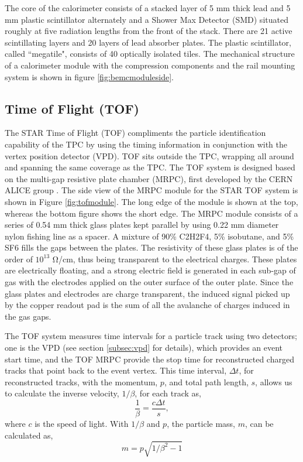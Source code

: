 
The core of the calorimeter consists of a stacked layer of 5 mm thick lead and 5 mm plastic scintillator alternately and a Shower Max Detector (SMD) situated roughly at five radiation lengths from the front of the stack. There are 21 active scintillating layers and 20 layers of lead absorber plates. The plastic scintillator, called ``megatile", consists of 40 optically isolated tiles. The mechanical structure of a calorimeter module with the compression components and the rail mounting system is shown in figure \ref{fig:bemcmoduleside}.
 
\subsection{Time of Flight (TOF)}
\label{subsec:tof}
The STAR Time of Flight (TOF) compliments the particle identification capability of the TPC by using the timing information in conjunction with the vertex position detector (VPD). TOF sits outside the TPC, wrapping all around and spanning the same coverage as the TPC. The TOF system is designed based on the multi-gap resistive plate chamber (MRPC), first developed by the CERN ALICE group \cite{Williams:2001mt}. The side view of the MRPC module for the STAR TOF system is shown in Figure \ref{fig:tofmodule}. The long edge of the module is shown at the top, whereas the bottom figure shows the short edge. The MRPC module consists of a series of  0.54 mm thick glass plates kept parallel by using 0.22 mm diameter nylon fishing line as a spacer. A mixture of 90\% C2H2F4, 5\% isobutane, and 5\% SF6 fills the gaps between the plates. The resistivity of these glass plates is of the order of $10^{13}$ \si{\ohm}/cm, thus being transparent to the electrical charges. These plates are electrically floating, and a strong electric field is generated in each sub-gap of gas with the electrodes applied on the outer surface of the outer plate. Since the glass plates and electrodes are charge transparent, the induced signal picked up by the copper readout pad is the sum of all the avalanche of charges induced in the gas gaps.  

The TOF system measures time intervals for a particle track using two detectors; one is the VPD (see section \ref{subsec:vpd} for details), which provides an event start time, and the TOF MRPC provide the stop time for reconstructed charged tracks that point back to the event vertex. This time interval, $\Delta t$, for reconstructed tracks, with the momentum, $p$, and total path length, $s$, allows us to calculate the inverse velocity, $1/\beta$, for each track as, 
\begin{equation}
    \frac{1}{\beta}  = \frac{c\Delta t}{s},
\end{equation}
where $c$ is the speed of light. With $1/\beta$ and $p$, the particle mass, $m$, can be calculated as,
\begin{equation}
    m = p \sqrt{1/\beta^2 -1}
\end{equation}

